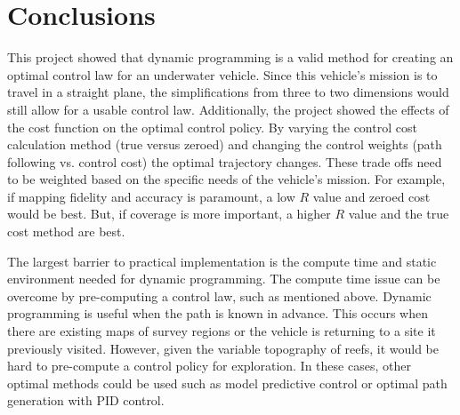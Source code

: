 \section{Conclusions}

This project showed that dynamic programming is a valid method for creating an optimal control law for an underwater vehicle. Since this vehicle's mission is to travel in a straight plane, the simplifications from three to two dimensions would still allow for a usable control law. Additionally, the project showed the effects of the cost function on the optimal control policy. By varying the control cost calculation method (true versus zeroed) and changing the control weights (path following vs. control cost) the optimal trajectory changes. These trade offs need to be weighted based on the specific needs of the vehicle's mission. For example, if mapping fidelity and accuracy is paramount, a low $R$ value and zeroed cost would be best. But, if coverage is more important, a higher $R$ value and the true cost method are best. 

The largest barrier to practical implementation is the compute time and static environment needed for dynamic programming. The compute time issue can be overcome by pre-computing a control law, such as mentioned above. Dynamic programming is useful when the path is known in advance. This occurs when there are existing maps of survey regions or the vehicle is returning to a site it previously visited. However, given the variable topography of reefs, it would be hard to pre-compute a control policy for exploration. In these cases, other optimal methods could be used such as model predictive control or optimal path generation with PID control. 


